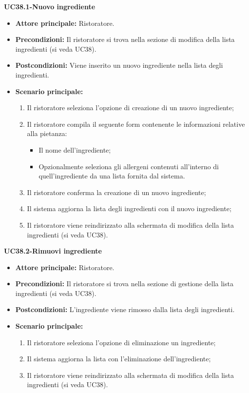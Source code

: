 \textbf{UC38.1-Nuovo ingrediente}
\begin{itemize}
    \item \textbf{Attore principale:} Ristoratore.
    \item \textbf{Precondizioni:} Il ristoratore si trova nella sezione di modifica della lista ingredienti (si veda UC38).
    \item \textbf{Postcondizioni:} Viene inserito un nuovo ingrediente nella lista degli ingredienti.
    \item \textbf{Scenario principale:}
    \begin{enumerate}
        \item Il ristoratore seleziona l'opzione di creazione di un nuovo ingrediente;
        \item Il ristoratore compila il seguente form contenente le informazioni relative alla pietanza:
        \begin{itemize}
            \item Il nome dell'ingrediente;
            \item Opzionalmente seleziona gli allergeni contenuti all'interno di quell'ingrediente da una lista fornita dal sistema.
        \end{itemize}
        \item Il ristoratore conferma la creazione di un nuovo ingrediente;
        \item Il sistema aggiorna la lista degli ingredienti con il nuovo ingrediente;
        \item Il ristoratore viene reindirizzato alla schermata di modifica della lista ingredienti (si veda UC38).
    \end{enumerate}
\end{itemize}


\textbf{UC38.2-Rimuovi ingrediente}
\begin{itemize}
    \item \textbf{Attore principale:} Ristoratore.
    \item \textbf{Precondizioni:} Il ristoratore si trova nella sezione di gestione della lista ingredienti (si veda UC38).
    \item \textbf{Postcondizioni:} L'ingrediente viene rimosso dalla lista degli ingredienti.
    \item \textbf{Scenario principale:}
    \begin{enumerate}
        \item Il ristoratore seleziona l'opzione di eliminazione un ingrediente;
        \item Il sistema aggiorna la lista con l'eliminazione dell'ingrediente;
        \item Il ristoratore viene reindirizzato alla schermata di modifica della lista ingredienti (si veda UC38).
    \end{enumerate}
\end{itemize}

